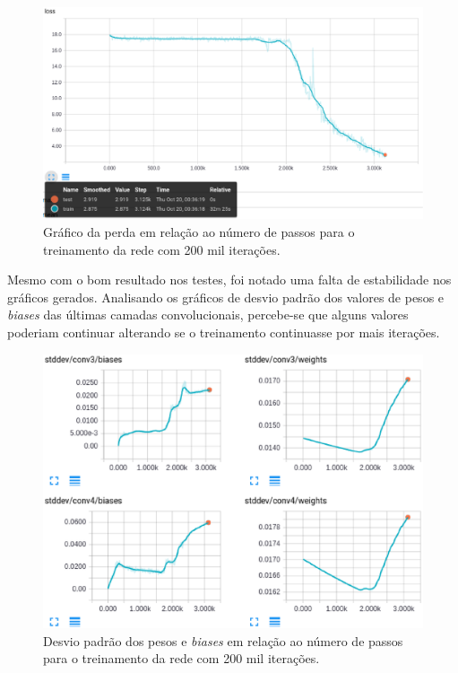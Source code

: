 \begin{figure}[H]
\centering
\includegraphics[scale=0.4]{imagens/loss_200k}
\caption{Gráfico da perda em relação ao número de passos para o
  treinamento da rede com 200 mil iterações.}
\label{fig:loss_200k}
\end{figure}

Mesmo com o bom resultado nos testes, foi notado uma falta de
estabilidade nos gráficos gerados. Analisando os gráficos de desvio
padrão dos valores de pesos e \textit{biases} das últimas camadas
convolucionais, percebe-se que alguns valores poderiam continuar
alterando se o treinamento continuasse por mais iterações.

\begin{figure}[H]
\centering
\includegraphics[scale=0.6]{imagens/stddev_200k}
\caption{Desvio padrão dos pesos e \textit{biases} em relação ao
  número de passos para o treinamento da rede com 200 mil iterações.}
\label{fig:stddev_200k}
\end{figure}

